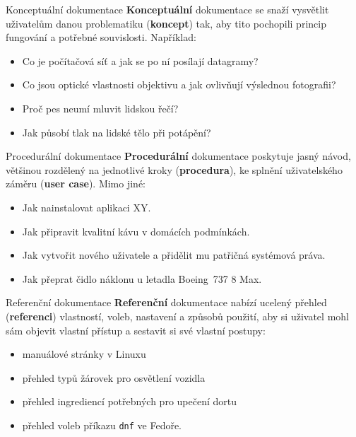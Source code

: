 \documentclass[12pt]{beamer}
\begin{document}
		\begin{frame}{Konceptuální dokumentace}
		\textbf{Konceptuální} dokumentace se snaží vysvětlit uživatelům danou problematiku (\textbf{koncept}) tak, aby tito pochopili princip fungování a potřebné souvislosti. Například:
		
		\begin{itemize}
			\item Co je počítačová síť a jak se po ní posílají datagramy?
			\item Co jsou optické vlastnosti objektivu a jak ovlivňují výslednou fotografii?
			\item Proč pes neumí mluvit lidskou řečí?
			\item Jak působí tlak na lidské tělo při potápění?
		\end{itemize}
		\end{frame}
	
		\begin{frame}{Procedurální dokumentace}
		\textbf{Procedurální} dokumentace poskytuje jasný návod, většinou rozdělený na jednotlivé kroky (\textbf{procedura}), ke splnění uživatelského záměru (\textbf{user case}). Mimo jiné:
	
		\begin{itemize}
			\item Jak nainstalovat aplikaci XY.
			\item Jak připravit kvalitní kávu v domácích podmínkách.
			\item Jak vytvořit nového uživatele a přidělit mu patřičná systémová práva.
			\item Jak přeprat čidlo náklonu u letadla Boeing~737 8 Max.
		\end{itemize}
		\end{frame}

		\begin{frame}{Referenční dokumentace}
		\textbf{Referenční} dokumentace nabízí ucelený přehled (\textbf{referenci}) vlastností, voleb, nastavení a způsobů použití, aby si uživatel mohl sám objevit vlastní přístup a sestavit si své vlastní postupy:

		\begin{itemize}
			\item manuálové stránky v Linuxu
			\item přehled typů žárovek pro osvětlení vozidla
			\item přehled ingrediencí potřebných pro upečení dortu
			\item přehled voleb příkazu \texttt{dnf} ve Fedoře.
		\end{itemize}
		\end{frame}
\end{document}
